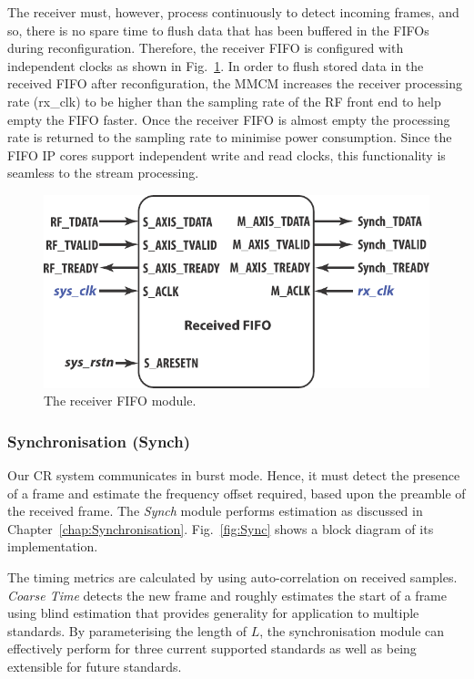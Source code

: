 The receiver must, however, process continuously to detect incoming frames, and so, there is no spare time to flush data that has been buffered in the FIFOs during reconfiguration.
Therefore, the receiver FIFO is configured with independent clocks as shown in Fig.~\ref{fig:FIFO}.
In order to flush stored data in the received FIFO after reconfiguration, the MMCM increases the receiver processing rate (rx\_clk) to be higher than the sampling rate of the RF front end to help empty the FIFO faster.
Once the receiver FIFO is almost empty the processing rate is returned to the sampling rate to minimise power consumption.
Since the FIFO IP cores support independent write and read clocks, this functionality is seamless to the stream processing.
\begin{figure}
\centering
\includegraphics [width=0.5\columnwidth]{Figures/MSCR_RX_FIFO.pdf}
\caption{The receiver FIFO module.}
\label{fig:FIFO}
\end{figure}

\subsubsection{Synchronisation (Synch)}
Our CR system communicates in burst mode.
Hence, it must detect the presence of a frame and estimate the frequency offset required, based upon the preamble of the received frame.
The \emph{Synch} module performs estimation as discussed in Chapter~\ref{chap:Synchronisation}.
Fig.~\ref{fig:Sync} shows a block diagram of its implementation.

The timing metrics are calculated by using auto-correlation on received samples.
\emph{Coarse Time} detects the new frame and roughly estimates the start of a frame using blind estimation that provides generality for application to multiple standards.
By parameterising the length of $L$, the synchronisation module can effectively perform for three current supported standards as well as being extensible for future standards.

